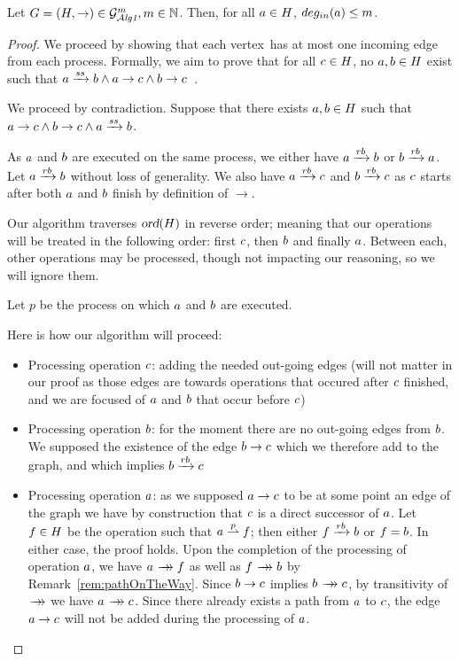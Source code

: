 \documentclass[12pt]{article}
\begin{document}
\begin{lemma}\label{lemma:degin}
Let $G=(H,\rightarrow)\in\mathcal{G}_{\mathcal{A}\emph{lg1}}^m,m\in\mathbb{N}$. Then, for all $a\in H$, \mbox{$deg_{in}(a) \leq m$}.
\end{lemma}
\begin{proof}

We proceed by showing that each vertex  has at most one incoming edge from each process. 
Formally, we aim to prove that for all $c \in H$, no $a,b\in H$ exist such that $a\xrightarrow{ss}b\land a\rightarrow c \land b\rightarrow c$~.

We proceed by contradiction. Suppose that there exists $a,b\in H$ such that $a\rightarrow c\land b\rightarrow c\land a\xrightarrow{ss}b$. 

As $a$ and $b$ are executed on the same process, we either have $a \xrightarrow{rb} b$ or $b \xrightarrow{rb} a$. Let $a \xrightarrow{rb} b$ without loss of generality. We also have $a \xrightarrow{rb} c$ and $b \xrightarrow{rb} c$ as $c$ starts after both $a$ and $b$ finish by definition of $\rightarrow$.

Our algorithm traverses $\textsl{ord}(H)$ in reverse order; meaning that our operations will be treated in the following order: first $c$, then $b$ and finally $a$. Between each, other operations may be processed, though not impacting our reasoning, so we will ignore them.

Let $p$ be the process on which $a$ and $b$ are executed.

Here is how our algorithm will proceed:

\begin{itemize}[label=$\ast$,itemsep=0pt,parsep=0pt]
	\item Processing operation $c$: adding the needed out-going edges (will not matter in our proof as those edges are towards operations that occured after $c$ finished, and we are focused of $a$ and $b$ that occur before $c$)
	\item Processing operation $b$: for the moment there are no out-going edges from $b$. We supposed the existence of the edge $b\rightarrow c$ which we therefore add to the graph, and which implies $b\xrightarrow{rb}c$
	\item Processing operation $a$: as we supposed $a\rightarrow c$ to be at some point an edge of the graph we have by construction that $c$ is a direct successor of $a$. Let $f \in H$ be the operation such that $a \stackrel{p}{\rightharpoonup} f$; then either $f\xrightarrow{rb}b$ or $f=b$. In either case, the proof holds. Upon the completion of the processing of operation $a$, we have $\opa \patharrow \opf$ as well as $\opf \patharrow \opb$ by Remark~\ref{rem:pathOnTheWay}. Since $b\rightarrow c$ implies $\opb \patharrow \opc$, by transitivity of $\patharrow$ we have $\opa \patharrow \opc$. Since there already exists a path from $a$ to $c$, the edge $a\rightarrow c$ will not be added during the processing of $a$.
	

\end{itemize}
\end{proof}
\end{document}
